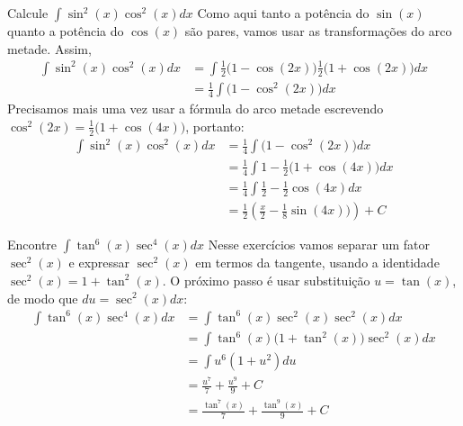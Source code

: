 \begin{example}
  Calcule \(\int \sin^2(x) \cos^2(x) dx\)
  \solution
  Como aqui tanto a potência do $\sin(x)$ quanto a potência
  do $\cos(x)$ são pares, vamos usar as transformações do arco metade.
  Assim,
  \begin{align*}
    \int \sin^2(x) \cos^2(x) dx
    & = \int \frac{1}{2}\big(1- \cos(2x)\big) \frac{1}{2}\big(1+ \cos(2x)\big) dx \\
    & = \frac{1}{4} \int \big(1- \cos^2(2x)\big) dx
  \end{align*}
  Precisamos mais uma vez usar a fórmula do arco metade escrevendo
  $\cos^2(2x)= \frac{1}{2}\big(1+ \cos(4x)\big)$, portanto:
  \begin{align*}
    \int \sin^2(x) \cos^2(x) dx
    & = \frac{1}{4} \int \big(1- \cos^2(2x)\big) dx \\
    & = \frac{1}{4} \int 1-\frac{1}{2}\big(1+ \cos(4x)\big)dx \\
    & = \frac{1}{4} \int   \frac{1}{2} - \frac{1}{2} \cos(4x) dx \\
    & = \frac{1}{2} \left( \frac{x}{2} - \frac{1}{8} \sin(4x))\right)+ C
  \end{align*}
\end{example}

\begin{example}
  Encontre \(\int \tan^6(x) \sec^4(x) dx\)
  \solution
  Nesse exercícios vamos separar um fator $\sec^2(x)$ e
  expressar $\sec^2(x)$ em termos da tangente, usando a identidade
  $\sec^2(x)=1+ \tan^2(x)$.
  O próximo passo é usar substituição
  $u=\tan(x)$, de modo que $du=\sec^2(x)dx$:
  \begin{align*}
    \int \tan^6(x) \sec^4(x) dx
    & = \int \tan^6(x) \sec^2(x)  \sec^2(x)dx  \\
    & = \int \tan^6(x) \big(1+ \tan^2(x)\big)  \sec^2(x)dx \\
    & = \int u^6\left(1+u^2\right) du \\
    & = \frac{u^7}{7}+ \frac{u^9}{9}+ C \\
    & = \frac{\tan^7(x)}{7}+ \frac{\tan^9(x)}{9}+ C
  \end{align*}
\end{example}

